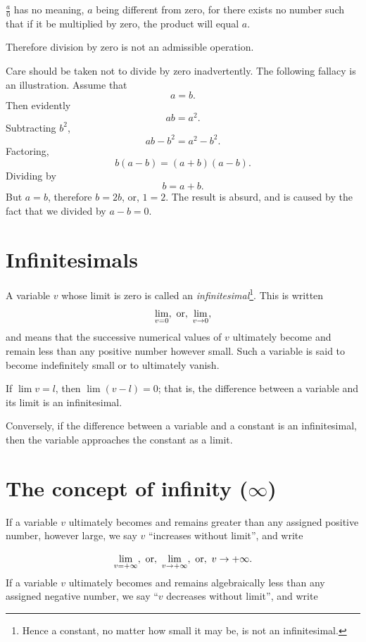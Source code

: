 $\frac{a}{0}$ has no meaning, $a$ being different from zero, 
for there exists no number such that if it be multiplied by zero, 
the product will equal $a$.

Therefore division by zero is not an admissible operation.

Care should be taken not to divide by zero inadvertently. The following 
fallacy is an illustration.
Assume that 
\[
	a 	= b.
\]
Then evidently 	
\[
ab = a^2.
\]
Subtracting $b^2$,
\[
 ab-b^2 	= a^2-b^2.
\]
Factoring, 	
\[
b(a-b) 	= (a + b)(a-b).
\]
Dividing by %
\[
b = a + b.
\]
But 	$a 	= b$,
therefore $b 	= 2b$,
or, 	$1 	= 2$.
The result is absurd, and is caused by the fact that we divided by 
$a-b = 0$.

\section{Infinitesimals}
\label{sec:15}

A variable $v$ whose limit is zero is called an {\it 
infinitesimal}\footnote{Hence a constant, no matter how small 
it may be, is not an infinitesimal.}.
This is written
\[
    \lim_{v = 0}, \ {\rm or},\ \lim_{v\rightarrow 0},
\]
and means that the successive numerical values of $v$ ultimately 
become and remain less than any positive number however small. 
Such a variable is said to become indefinitely small or to ultimately vanish.

If   $\lim v = l$, then $\lim (v-l) = 0$;
that is, the difference between a variable and its limit is an infinitesimal.

Conversely, if the difference between a variable and a 
constant is an infinitesimal, then the variable approaches the 
constant as a limit.

\section{The concept of infinity ($\infty$)}

If a variable $v$ ultimately becomes and remains greater than 
any assigned positive number, however large, we say $v$ 
``increases without limit'', and write

\[
\lim_{v = +\infty},\ {\rm or},\ \lim_{v\rightarrow +\infty},  \ {\rm or},
\ v\rightarrow +\infty.
\]
If a variable $v$ ultimately becomes and remains algebraically 
less than any assigned negative number, we say 
``$v$ decreases without limit'', and write

